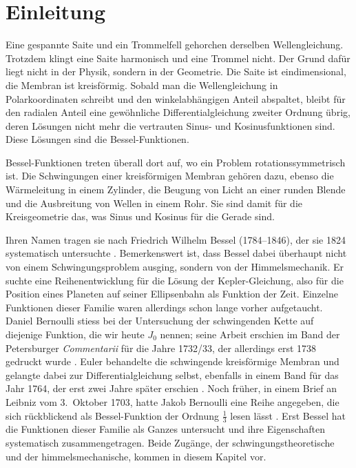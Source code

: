 %
%
%
%
\section{Einleitung\label{bessel:section:einleitung}}
%
%
Eine gespannte Saite und ein Trommelfell gehorchen derselben Wellengleichung.
Trotzdem klingt eine Saite harmonisch und eine Trommel nicht.
Der Grund dafür liegt nicht in der Physik, sondern in der Geometrie.
Die Saite ist eindimensional, die Membran ist kreisförmig.
Sobald man die Wellengleichung in Polarkoordinaten schreibt und den winkelabhängigen Anteil abspaltet, bleibt für den radialen Anteil eine gewöhnliche Differentialgleichung zweiter Ordnung übrig, deren Lösungen nicht mehr die vertrauten Sinus- und Kosinusfunktionen sind.
Diese Lösungen sind die Bessel-Funktionen.

Bessel-Funktionen treten überall dort auf, wo ein Problem rotationssymmetrisch ist.
Die Schwingungen einer kreisförmigen Membran gehören dazu, ebenso die Wärmeleitung in einem Zylinder, die Beugung von Licht an einer runden Blende und die Ausbreitung von Wellen in einem Rohr.
Sie sind damit für die Kreisgeometrie das, was Sinus und Kosinus für die Gerade sind.

Ihren Namen tragen sie nach Friedrich Wilhelm Bessel (1784--1846), der sie 1824 systematisch untersuchte \cite{bessel:bessel1824}.
Bemerkenswert ist, dass Bessel dabei überhaupt nicht von einem Schwingungsproblem ausging, sondern von der Himmelsmechanik.
Er suchte eine Reihenentwicklung für die Lösung der Kepler-Gleichung, also für die Position eines Planeten auf seiner Ellipsenbahn als Funktion der Zeit.
Einzelne Funktionen dieser Familie waren allerdings schon lange vorher aufgetaucht.
Daniel Bernoulli stiess bei der Untersuchung der schwingenden Kette auf diejenige Funktion, die wir heute $J_0$ nennen; seine Arbeit erschien im Band der Petersburger \emph{Commentarii} für die Jahre 1732/33, der allerdings erst 1738 gedruckt wurde \cite{bessel:bernoulli1732}.
Euler behandelte die schwingende kreisförmige Membran und gelangte dabei zur Differentialgleichung selbst, ebenfalls in einem Band für das Jahr 1764, der erst zwei Jahre später erschien \cite{bessel:euler1764}.
Noch früher, in einem Brief an Leibniz vom 3.~Oktober 1703, hatte Jakob Bernoulli eine Reihe angegeben, die sich rückblickend als Bessel-Funktion der Ordnung $\frac13$ lesen lässt \cite{bessel:dutka1995}.
Erst Bessel hat die Funktionen dieser Familie als Ganzes untersucht und ihre Eigenschaften systematisch zusammengetragen.
Beide Zugänge, der schwingungstheoretische und der himmelsmechanische, kommen in diesem Kapitel vor.

